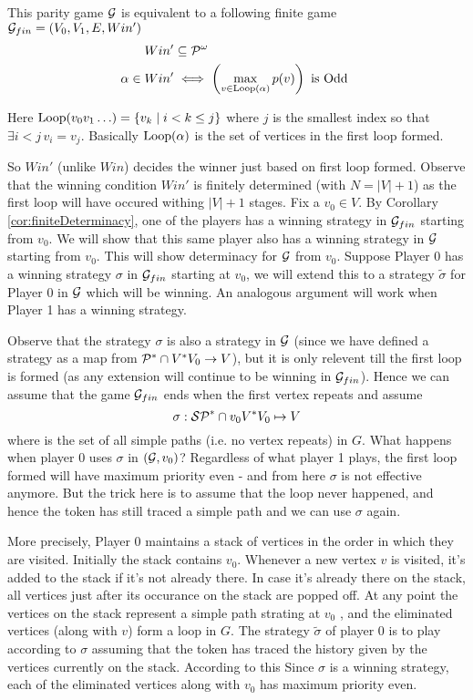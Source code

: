 This parity game $\mathcal{G}$ is equivalent to a following finite game $\mathcal{G}_{fin}=(V_0,V_1,E,Win')$
\begin{align}
    Win' &\subseteq \mathcal{P}^\omega\\
    \alpha \in Win' &\iff \left(\max_{v \in \operatorname*{Loop}(\alpha)} p(v)\right) \text{ is Odd }
\end{align}

Here $\operatorname*{Loop}(v_0v_1\ldots) = \{ v_k \mid i < k \leq j \}$ where $j$ is the smallest index so that $\exists i < j \, v_i = v_j$. Basically $\operatorname*{Loop}(\alpha)$ is the set of vertices in the first loop formed.

So $Win'$ (unlike $Win$) decides the winner just based on first loop formed. Observe that the winning condition $Win'$ is finitely determined (with $N=|V|+1$) as the first loop will have occured withing $|V|+1$ stages.
Fix a $v_0 \in V$. By Corollary \ref{cor:finiteDeterminacy}, one of the players has a winning strategy in $\mathcal{G}_{fin}$ starting from $v_0$. We will show that this same player also has a winning strategy in $\mathcal{G}$ starting from $v_0$. This will show determinacy for $\mathcal{G}$ from $v_0$. Suppose Player 0 has a winning strategy $\sigma$ in $\mathcal{G}_{fin}$ starting at $v_0$, we will extend this to a strategy $\tilde{\sigma}$ for Player 0 in $\mathcal{G}$ which will be winning. An analogous argument will work when Player 1 has a winning strategy.

Observe that the strategy $\sigma$ is also a strategy in $\mathcal{G}$ (since we have defined a strategy as a map from $\mathcal{P}^{*} \cap V^*V_0 \to V$), but it is only relevent till the first loop is formed (as any extension will continue to be winning in $\mathcal{G}_{fin}$). Hence we can assume that the game $\mathcal{G}_{fin}$ ends when the first vertex repeats and assume
\[
    \sigma : \mathcal{SP}^* \cap v_0V^*V_0 \mapsto V
\]
where \SP is the set of all simple paths (i.e. no vertex repeats) in $G$. What happens when player 0 uses $\sigma$ in $(\mathcal{G},v_0)$? Regardless of what player 1 plays, the first loop formed will have maximum priority even - and from here $\sigma$ is not effective anymore. But the trick here is to assume that the loop never happened, and hence the token has still traced a simple path and we can use $\sigma$ again.  

More precisely, Player 0 maintains a stack of vertices in the order in which they are visited. Initially the stack contains $v_0$. Whenever a new vertex $v$ is visited, it's added to the stack if it's not already there. In case it's already there on the stack, all vertices just after its occurance on the stack are popped off. At any point the vertices on the stack represent a simple path strating at $v_0$ , and the eliminated vertices (along with $v$) form a loop in $G$. The strategy $\tilde{\sigma}$ of player 0 is to play according to $\sigma$ assuming that the token has traced the history given by the vertices currently on the stack. According to this Since $\sigma$ is a winning strategy, each of the eliminated vertices along with $v_0$ has maximum priority even.

